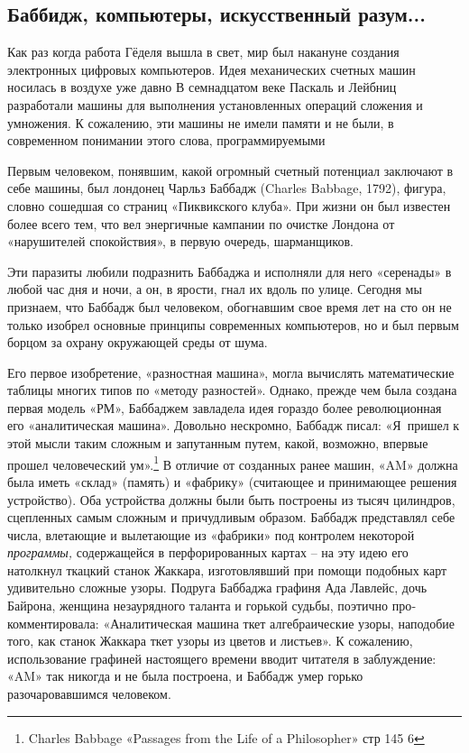 \documentclass[../main.tex]{subfiles}
\begin{document}
\subsection{Баббидж, компьютеры, искусственный разум...}

Как раз когда работа Гёделя вышла в свет, мир был накануне создания электронных цифровых компьютеров. Идея механических счетных машин носилась в воздухе уже давно В семнадцатом веке Паскаль и Лейбниц разработали машины для выполнения установленных операций сложения и умножения. К сожалению, эти машины не имели памяти и не были, в современном понимании этого слова, программируемыми

Первым человеком, понявшим, какой огромный счетный потенциал заключают в себе машины, был лондонец Чарльз Баббадж (Charles Babbage, 1792), фигура, словно сошедшая со страниц «Пиквикского клуба». При жизни он был известен более всего тем, что вел энергичные кампании по очистке Лондона от «нарушителей спокойствия», в первую очередь, шарманщиков.

Эти паразиты любили подразнить Баббаджа и исполняли для него «серенады» в любой час дня и ночи, а он, в ярости, гнал их вдоль по улице. Сегодня мы признаем, что Баббадж был человеком, обогнавшим свое время лет на сто он не только изобрел основные принципы современных компьютеров, но и был первым борцом за охрану окружающей среды от шума.

Его первое изобретение, «разностная машина», могла вычислять математические таблицы многих типов по «методу разностей». Однако, прежде чем была создана первая модель «РМ», Баббаджем завладела идея гораздо более революционная его «аналитическая машина». Довольно нескромно, Баббадж писал: «Я~пришел к этой мысли таким сложным и запутанным путем, какой, возможно, впервые прошел человеческий ум».\footnote{Charles Babbage «Passages from the Life of a Philosopher» стр 145 6} В отличие от созданных ранее машин, «AM» должна была иметь «склад» (память) и «фабрику» (считающее и принимающее решения устройство). Оба устройства должны были быть построены из тысяч цилиндров, сцепленных самым сложным и причудливым образом. Баббадж представлял себе числа, влетающие и вылетающие из «фабрики» под контролем некоторой \emph{программы,} содержащейся в перфорированных картах \--- на эту идею его натолкнул ткацкий станок Жаккара, изготовлявший при помощи подобных карт удивительно сложные узоры. Подруга Баббаджа графиня Ада Лавлейс, дочь Байрона, женщина незаурядного таланта и горькой судьбы, поэтично про­комментировала: «Аналитическая машина ткет алгебраические узоры, наподобие того, как станок Жаккара ткет узоры из цветов и листьев». К сожалению, использование графиней настоящего времени вводит читателя в заблуждение: «AM» так никогда и не была построена, и Баббадж умер горько разочаровавшимся человеком.
\end{document}
